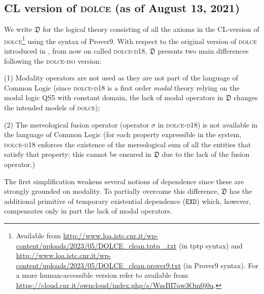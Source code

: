 \documentclass[ao]{iosart2x}
\newcommand{\nb}[1]{\textcolor{red}{$|$}\marginpar{\hspace*{-0cm}\parbox{20mm}{\scriptsize\raggedright\textcolor{red}{#1}}}}
\newcommand{\bflist}{\begin{list}{}{\setlength{\topsep}{2mm}\setlength{\parsep}{0mm}\setlength{\leftmargin}{9.2mm}\setlength{\labelwidth}{8mm}}}
\newcommand{\eflist}{\end{list}}
\newcommand{\dolceDefLabel}{\textrm{d$_\texttt{d}$}}
\newcommand{\refdolcedf}[1]{({\dolceDefLabel}\ref{#1})}
\newcommand{\pr}[1]{\mathtt{#1}}
\newcommand{\dolce}{{\textsc{dolce}}}
\newcommand{\dolceorig}{{\textsc{dolce-d{\footnotesize 18}}}}
\newcommand {\thdolce} {\ensuremath{\mathfrak{D}}}
\newcommand {\SDd} {\ensuremath{\pr{SD}}}
\newcommand {\EXDd} {\ensuremath{\pr{EXD}}}
\begin{document}
\subsection{CL version of {\dolce} (as of August 13, 2021) }\label{sect_dolce}

%
%
%
We write $\thdolce$ for the logical theory consisting of all the axioms in the CL-version of {\dolce}\footnote{Available from \url{http://www.loa.istc.cnr.it/wp-content/uploads/2023/05/DOLCE_clean.tptp_.txt} (in tptp syntax) and \url{http://www.loa.istc.cnr.it/wp-content/uploads/2023/05/DOLCE_clean.prover9.txt} (in Prover9 syntax). For a more human-accessible version refer to \citep[ch.2]{D24} available from \url{https://cloud.cnr.it/owncloud/index.php/s/WzsBI7qw3Om0j0u}.} using the syntax of Prover9. With respect to the original version of {\dolce} introduced in \citep{D18}, from now on called {\dolceorig},
$\thdolce$ presents two main differences following the {\dolce-\textsc{iso}} version:
\bflist
\item[(1)] Modality operators are not used as they are not part of the language of Common Logic (since {\dolceorig} is a first order {\em modal} theory relying on the modal logic QS5 with constant domain, the lack of modal operators in $\thdolce$ changes the intended models of {\dolce}); 
\item[(2)] The mereological fusion operator (operator $\sigma$ in {\dolceorig}) is not available in the language of Common Logic (for each property expressible in the system, {\dolceorig} enforces the existence of the mereological sum of all the entities that satisfy that property; this cannot be ensured in $\thdolce$ due to the lack of the fusion operator.)
\eflist

The first simplification weakens several notions of dependence since these are strongly grounded on modality. To partially overcome this difference, $\thdolce$ has the additional primitive of temporary existential dependence ($\EXDd$) which, however, compensates only in part the lack of modal operators. %
\end{document}
